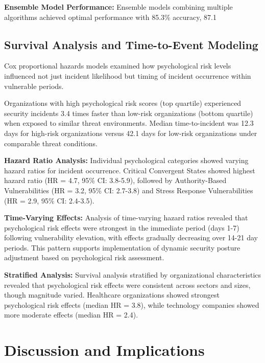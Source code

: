 \documentclass[10pt, twocolumn]{article}
\begin{document}
\textbf{Ensemble Model Performance:} Ensemble models combining multiple algorithms achieved optimal performance with 85.3\% accuracy, 87.1%

\subsection{Survival Analysis and Time-to-Event Modeling}

Cox proportional hazards models examined how psychological risk levels influenced not just incident likelihood but timing of incident occurrence within vulnerable periods.

Organizations with high psychological risk scores (top quartile) experienced security incidents 3.4 times faster than low-risk organizations (bottom quartile) when exposed to similar threat environments. Median time-to-incident was 12.3 days for high-risk organizations versus 42.1 days for low-risk organizations under comparable threat conditions.

\textbf{Hazard Ratio Analysis:} Individual psychological categories showed varying hazard ratios for incident occurrence. Critical Convergent States showed highest hazard ratio (HR = 4.7, 95\% CI: 3.8-5.9), followed by Authority-Based Vulnerabilities (HR = 3.2, 95\% CI: 2.7-3.8) and Stress Response Vulnerabilities (HR = 2.9, 95\% CI: 2.4-3.5).

\textbf{Time-Varying Effects:} Analysis of time-varying hazard ratios revealed that psychological risk effects were strongest in the immediate period (days 1-7) following vulnerability elevation, with effects gradually decreasing over 14-21 day periods. This pattern supports implementation of dynamic security posture adjustment based on psychological risk assessment.

\textbf{Stratified Analysis:} Survival analysis stratified by organizational characteristics revealed that psychological risk effects were consistent across sectors and sizes, though magnitude varied. Healthcare organizations showed strongest psychological risk effects (median HR = 3.8), while technology companies showed more moderate effects (median HR = 2.4).

\section{Discussion and Implications}
\end{document}
